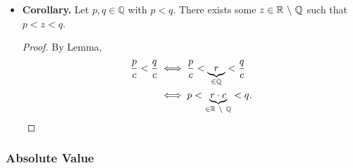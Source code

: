 \documentclass{article}
\newcommand{\Q}{\mathbb{Q}}
\newcommand{\R}{\mathbb{R}}
\newcommand{\?}{\stackrel{?}{=}}
\theoremstyle{definition} %
\begin{document}
\begin{itemize}
\begin{proof}
              Let $r := \nicefrac{(\lfloor nx \rfloor + 1)}{n} \in \Q$. Then we have
              \begin{align*}
                  x = \frac{nx}{n} & < \frac{\lfloor nx \rfloor + 1}{n} \\
                                   & \leq \frac{nx + 1}{n}              \\
                                   & = x + \frac{1}{n}                  \\
                                   & = x + y - x                        \\
                                   & < y.
              \end{align*}
          \end{proof}
    \item \textbf{Corollary.} Let $p, q \in \Q$ with $p < q$. There exists some $z \in \R \ \symbol{92} \ \Q$ such that $p < z < q$.
          \begin{proof}
              By Lemma,
              \begin{align*}
                  \frac{p}{c} < \frac{q}{c} & \iff \frac{p}{c} < \underbrace{r}_{\in \Q} < \frac{q}{c}         \\
                                            & \iff p < \underbrace{r \cdot c}_{\in \R \ \symbol{92} \ \Q} < q.
              \end{align*}
          \end{proof}
\end{itemize}

\subsubsection{Absolute Value}
\end{document}
